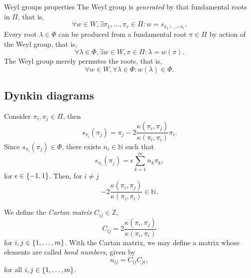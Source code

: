 \begin{theorem}{Weyl groups properties}{}
    The Weyl group is \emph{generated} by that fundamental roots in \(\Pi\), that is,
    \begin{equation*}
        \forall w \in W, \exists \pi_1, \dots, \pi_r \in \Pi: w = s_{\pi_1 \circ \dots \circ \pi_r}.
    \end{equation*}
    Every root \(\lambda \in \Phi\) can be produced from a fundamental root \(\pi \in \Pi\) by action of the Weyl group, that is,
    \begin{equation*}
        \forall \lambda \in \Phi, \exists w \in W, \pi \in \Pi : \lambda = w(\pi).
    \end{equation*}
    The Weyl group merely permutes the roots, that is,
    \begin{equation*}
        \forall w \in W, \forall \lambda \in \Phi : w(\lambda) \in \Phi.
    \end{equation*}
\end{theorem}

\subsection{Dynkin diagrams}

Consider \(\pi_i, \pi_j \in \Pi\), then
\begin{equation*}
    s_{\pi_i}(\pi_j) = \pi_j - 2 \frac{\kappa(\pi_i, \pi_j)}{\kappa(\pi_i, \pi_i)}\pi_i.
\end{equation*}
Since \(s_{\pi_i}(\pi_j) \in \Phi\), there exists \(n_i \in \mathbb{N}\) such that
\begin{equation*}
    s_{\pi_i}(\pi_j) = \epsilon \sum_{k=1}^{m}n_k \pi_k,
\end{equation*}
for \(\epsilon \in \{-1, 1\}\). Then, for \(i \neq j\)
\begin{equation*}
    -2 \frac{\kappa(\pi_i, \pi_j)}{\kappa(\pi_i, \pi_i)} \in \mathbb{N}.
\end{equation*}

We define the \emph{Cartan matrix} \(C_{ij} \in \mathbb{Z}\),
\begin{equation*}
    C_{ij} = 2 \frac{\kappa(\pi_i, \pi_j)}{\kappa(\pi_i, \pi_i)}
\end{equation*}
for \(i,j \in \{1,\dots, m\}\). With the Cartan matrix, we may define a matrix whose elements are called \emph{bond numbers}, given by
\begin{equation*}
    n_{ij} = C_{ij} C_{ji},
\end{equation*}
for all \(i, j \in \{1, \dots, m\}\).

